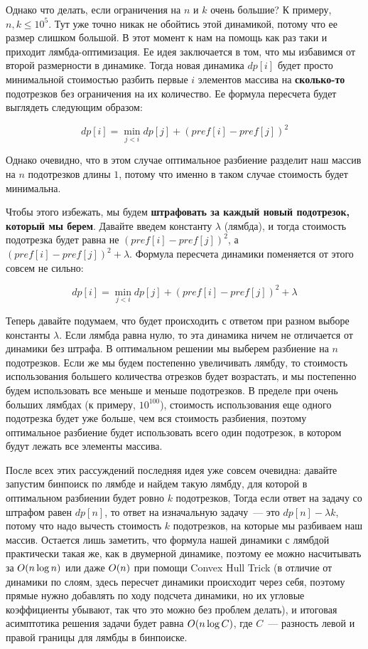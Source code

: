 Однако что делать, если ограничения на $n$ и $k$ очень большие? К примеру, $n, k \le 10^5$. Тут уже точно никак не обойтись этой динамикой, потому что ее размер слишком большой. В этот момент к нам на помощь как раз таки и приходит лямбда-оптимизация. Ее идея заключается в том, что мы избавимся от второй размерности в динамике. Тогда новая динамика $dp[i]$ будет просто минимальной стоимостью разбить первые $i$ элементов массива на \textbf{сколько-то} подотрезков без ограничения на их количество. Ее формула пересчета будет выглядеть следующим образом:

$$dp[i] = \min_{j < i} dp[j] + (pref[i] - pref[j])^2$$

Однако очевидно, что в этом случае оптимальное разбиение разделит наш массив на $n$ подотрезков длины $1$, потому что именно в таком случае стоимость будет минимальна.

Чтобы этого избежать, мы будем \textbf{штрафовать за каждый новый подотрезок, который мы берем}. Давайте введем константу $\lambda$ (лямбда), и тогда стоимость подотрезка будет равна не $(pref[i] - pref[j])^2$, а $(pref[i] - pref[j])^2 + \lambda$. Формула пересчета динамики поменяется от этого совсем не сильно:

$$dp[i] = \min_{j < i} dp[j] + (pref[i] - pref[j])^2 + \lambda$$

Теперь давайте подумаем, что будет происходить с ответом при разном выборе константы $\lambda$. Если лямбда равна нулю, то эта динамика ничем не отличается от динамики без штрафа. В оптимальном решении мы выберем разбиение на $n$ подотрезков. Если же мы будем постепенно увеличивать лямбду, то стоимость использования большего количества отрезков будет возрастать, и мы постепенно будем использовать все меньше и меньше подотрезков. В пределе при очень больших лямбдах (к примеру, $10^{100}$), стоимость использования еще одного подотрезка будет уже больше, чем вся стоимость разбиения, поэтому оптимальное разбиение будет использовать всего один подотрезок, в котором будут лежать все элементы массива.

После всех этих рассуждений последняя идея уже совсем очевидна: давайте запустим бинпоиск по лямбде и найдем такую лямбду, для которой в оптимальном разбиении будет ровно $k$ подотрезков, Тогда если ответ на задачу со штрафом равен $dp[n]$, то ответ на изначальную задачу~--- это $dp[n] - \lambda k$, потому что надо вычесть стоимость $k$ подотрезков, на которые мы разбиваем наш массив. Остается лишь заметить, что формула нашей динамики с лямбдой практически такая же, как в двумерной динамике, поэтому ее можно насчитывать за $O(n \log n)$ или даже $O(n)$ при помощи Convex Hull Trick (в отличие от динамики по слоям, здесь пересчет динамики происходит через себя, поэтому прямые нужно добавлять по ходу подсчета динамики, но их угловые коэффициенты убывают, так что это можно без проблем делать), и итоговая асимптотика решения задачи будет равна $O(n \log C)$, где $C$~--- разность левой и правой границы для лямбды в бинпоиске.

